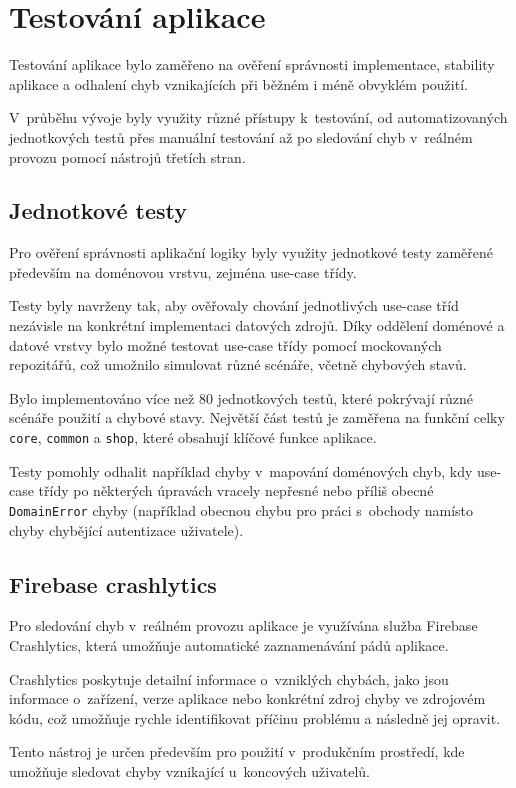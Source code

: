 \chapter{Testování aplikace}
Testování aplikace bylo zaměřeno na ověření správnosti implementace, stability aplikace a odhalení chyb vznikajících při běžném i méně obvyklém použití.

V~průběhu vývoje byly využity různé přístupy k~testování, od automatizovaných jednotkových testů přes manuální testování až po sledování chyb v~reálném provozu pomocí nástrojů třetích stran.


\section{Jednotkové testy}
Pro ověření správnosti aplikační logiky byly využity jednotkové testy zaměřené především na doménovou vrstvu, zejména use-case třídy.

Testy byly navrženy tak, aby ověřovaly chování jednotlivých use-case tříd nezávisle na konkrétní implementaci datových zdrojů.
Díky oddělení doménové a datové vrstvy bylo možné testovat use-case třídy pomocí mockovaných repozitářů, což umožnilo simulovat různé scénáře, včetně chybových stavů.

Bylo implementováno více než 80 jednotkových testů, které pokrývají různé scénáře použití a chybové stavy.
Největší část testů je zaměřena na funkční celky \texttt{core}, \texttt{common} a \texttt{shop}, které obsahují klíčové funkce aplikace.

Testy pomohly odhalit například chyby v~mapování doménových chyb, kdy use-case třídy po některých úpravách vracely nepřesné nebo příliš obecné \texttt{Domain\-Error} chyby (například obecnou chybu pro práci s~obchody namísto chyby chybějící autentizace uživatele).


\section{Firebase crashlytics}\label{sec:crashlytics}
Pro sledování chyb v~reálném provozu aplikace je využívána služba Firebase Crashlytics, která umožňuje automatické zaznamenávání pádů aplikace.

Crashlytics poskytuje detailní informace o~vzniklých chybách, jako jsou informace o~zařízení, verze aplikace nebo konkrétní zdroj chyby ve zdrojovém kódu, což umožňuje rychle identifikovat příčinu problému a následně jej opravit.

Tento nástroj je určen především pro použití v~produkčním prostředí, kde umožňuje sledovat chyby vznikající u~koncových uživatelů.



